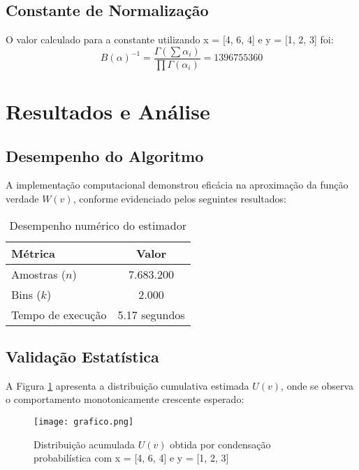\documentclass[12pt, a4paper]{article}
\begin{document}
\subsection{Constante de Normalização}

O valor calculado para a constante utilizando x = [4, 6, 4] e
y = [1, 2, 3] foi:
\[
B(\alpha)^{-1} = \frac{\Gamma(\sum \alpha_i)}{\prod \Gamma(\alpha_i)} = 1396755360
\]

\section{Resultados e Análise}

\subsection{Desempenho do Algoritmo}

A implementação computacional demonstrou eficácia na aproximação da função verdade $W(v)$, conforme evidenciado pelos seguintes resultados:

\begin{table}[H]
\centering
\caption{Desempenho numérico do estimador}
\begin{tabular}{|l|c|}
\hline
\textbf{Métrica} & \textbf{Valor} \\ \hline
Amostras ($n$) & 7.683.200 \\
Bins ($k$) & 2.000 \\
Tempo de execução & 5.17 segundos \\ \hline

\end{tabular}
\label{tab:performance}
\end{table}

\subsection{Validação Estatística}

A Figura \ref{fig:distribuicao} apresenta a distribuição cumulativa estimada $U(v)$, onde se observa o comportamento monotonicamente crescente esperado:

\begin{figure}[H]
\centering
\texttt{[image: grafico.png]}
\caption{Distribuição acumulada $U(v)$ obtida por condensação probabilística com x = [4, 6, 4] e
y = [1, 2, 3]}
\label{fig:distribuicao}
\end{figure}
\end{document}
